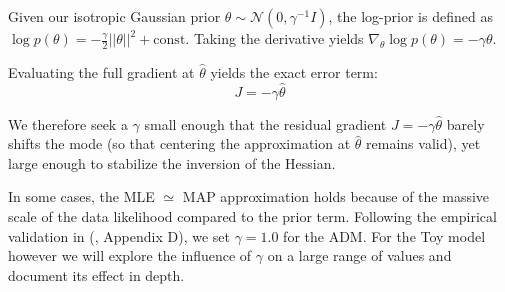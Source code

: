 Given our isotropic Gaussian prior $\theta \sim \mathcal{N}(0, \gamma^{-1}I)$, the log-prior is defined as $\log p(\theta) = - \frac{\gamma}{2} ||\theta||^2 + \mathrm{const}$. Taking the derivative yields $\nabla_\theta \log p(\theta) = -\gamma \theta$. 

Evaluating the full gradient at $\hat\theta$ yields the exact error term:
\begin{equation}
J = - \gamma \hat\theta
\end{equation}

We therefore seek a $\gamma$ small enough that the residual gradient $J = -\gamma\hat\theta$ barely shifts the mode (so that centering the approximation at $\hat\theta$ remains valid), yet large enough to stabilize the inversion of the Hessian.

In some cases, the \acs{MLE} $\simeq$ \acs{MAP} approximation holds because of the massive scale of the data likelihood compared to the prior term. Following
the empirical validation in (\cite{jazbec_generative_2025}, Appendix D), we set
$\gamma = 1.0$ for the \acs{ADM}. For the Toy model however we will explore the influence of $\gamma$ on a large range of values and document its effect in depth.




